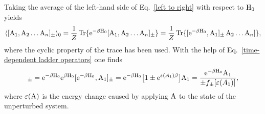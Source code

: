 Taking the average of the left-hand side of Eq.~\ref{left to right} with respect
to $\mathrm H_0$ yields
%
\begin{equation*}
    \langle[\mathrm A_1, \mathrm A_2 \dots \mathrm A_n]_\pm\rangle_0
    = \frac 1 Z \operatorname{Tr} \{
    \mathrm e^{-\beta \mathrm H_0} [ \mathrm A_1, \mathrm A_2 \dots \mathrm A_n ]_\pm \}
    = \frac 1 Z \operatorname{Tr} \{
    [\mathrm e^{-\beta \mathrm H_0}, \mathrm A_1]_\pm \, \mathrm A_2 \dots \mathrm A_n] \},
\end{equation*}
%
where the cyclic property of the trace has been used. With the help of
Eq.~\ref{time-dependent ladder operators} one finds
%
\begin{equation*}
    [\E^{-\beta \op H_0}, \op A_1]_\pm
    = \E^{-\beta \op H_0} \E^{\beta \op H_0} [\E^{-\beta \op H_0}, \op A_1]_\pm
    = \E^{-\beta \op H_0} \big[
        1 \pm \E^{\epsilon(A_1) \beta}
    \big] \op A_1
    = \frac{\E^{-\beta \op H_0} \op A_1}{\pm f_\pm[\epsilon(A_1)]},
\end{equation*}
%
where $\varepsilon(\mathrm A)$ is the energy change caused by applying $\mathrm A$ to the
state of the unperturbed system.

